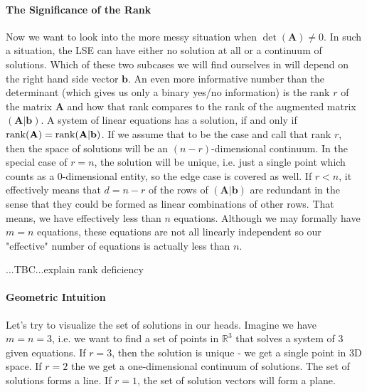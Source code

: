 \paragraph{The Significance of the Rank}
Now we want to look into the more messy situation when $\det(\mathbf{A}) \neq 0$. In such a situation, the LSE can have either no solution at all or a continuum of solutions. Which of these two subcases we will find ourselves in will depend on the right hand side vector $\mathbf{b}$. An even more informative number than the determinant (which gives us only a binary yes/no information) is the rank $r$ of the matrix $\mathbf{A}$ and how that rank compares to the rank of the augmented matrix $(\mathbf{A|b})$. A system of linear equations has a solution, if and only if $\operatorname{rank}(\mathbf{A}) = \operatorname{rank}(\mathbf{A|b})$. If we assume that to be the case and call that rank $r$, then the space of solutions will be an $(n-r)$-dimensional continuum. In the special case of $r = n$, the solution will be unique, i.e. just a single point which counts as a $0$-dimensional entity, so the edge case is covered as well. If $r < n$, it effectively means that $d = n-r$ of the rows of $(\mathbf{A|b})$ are redundant in the sense that they could be formed as linear combinations of other rows. That means, we have effectively less than $n$ equations. Although we may formally have $m = n$ equations, these equations are not all linearly independent so our "effective" number of equations is actually less than $n$.

...TBC...explain rank deficiency




\paragraph{Geometric Intuition} Let's try to visualize the set of solutions in our heads. Imagine we have $m=n=3$, i.e. we want to find a set of points in $\mathbb{R}^3$ that solves a system of 3 given equations. If $r = 3$, then the solution is unique - we get a single point in 3D space. If $r=2$ the we get a one-dimensional continuum of solutions. The set of solutions forms a line. If $r=1$, the set of solution vectors will form a plane.

